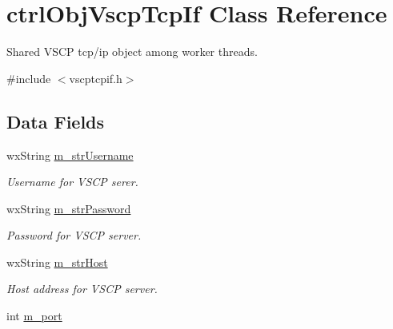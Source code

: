 \hypertarget{classctrl_obj_vscp_tcp_if}{
\section{ctrlObjVscpTcpIf Class Reference}
\label{d8/dde/classctrl_obj_vscp_tcp_if}
}


Shared VSCP tcp/ip object among worker threads.  




{\ttfamily \#include $<$vscptcpif.h$>$}

\subsection*{Data Fields}
\begin{DoxyCompactItemize}
\item 
\hypertarget{classctrl_obj_vscp_tcp_if_a98c2e7564dbd19f155cfa374bcaf559f}{
wxString \hyperlink{classctrl_obj_vscp_tcp_if_a98c2e7564dbd19f155cfa374bcaf559f}{m\_\-strUsername}}
\label{d8/dde/classctrl_obj_vscp_tcp_if_a98c2e7564dbd19f155cfa374bcaf559f}

\begin{DoxyCompactList}\small\item\em Username for VSCP serer. \end{DoxyCompactList}\item 
\hypertarget{classctrl_obj_vscp_tcp_if_abf247fc70d31ff92c4cfc886c889b085}{
wxString \hyperlink{classctrl_obj_vscp_tcp_if_abf247fc70d31ff92c4cfc886c889b085}{m\_\-strPassword}}
\label{d8/dde/classctrl_obj_vscp_tcp_if_abf247fc70d31ff92c4cfc886c889b085}

\begin{DoxyCompactList}\small\item\em Password for VSCP server. \end{DoxyCompactList}\item 
\hypertarget{classctrl_obj_vscp_tcp_if_ac1e738de460e3f3fc52231c1fa2ea8fb}{
wxString \hyperlink{classctrl_obj_vscp_tcp_if_ac1e738de460e3f3fc52231c1fa2ea8fb}{m\_\-strHost}}
\label{d8/dde/classctrl_obj_vscp_tcp_if_ac1e738de460e3f3fc52231c1fa2ea8fb}

\begin{DoxyCompactList}\small\item\em Host address for VSCP server. \end{DoxyCompactList}\item 
\hypertarget{classctrl_obj_vscp_tcp_if_a664f68281fb64c5687e8f160fd6e4372}{
int \hyperlink{classctrl_obj_vscp_tcp_if_a664f68281fb64c5687e8f160fd6e4372}{m\_\-port}}
\label{d8/dde/classctrl_obj_vscp_tcp_if_a664f68281fb64c5687e8f160fd6e4372}


\end{DoxyCompactItemize}
